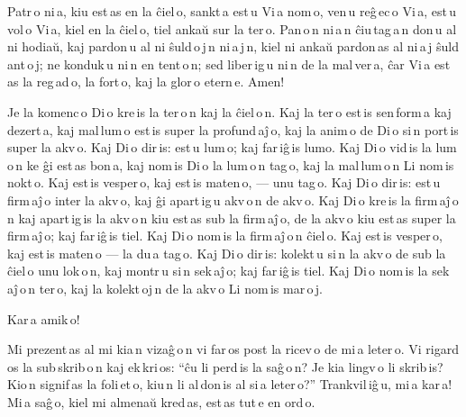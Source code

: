 
Patr\,o ni\,a, kiu est\,as en la ĉiel\,o, sankt\,a est\,u Vi\,a nom\,o, ven\,u reĝ\,ec\,o Vi\,a, est\,u vol\,o Vi\,a, kiel en la ĉiel\,o, tiel ankaŭ sur la ter\,o. Pan\,o\,n ni\,a\,n ĉiu\,tag\,a\,n don\,u al ni hodiaŭ, kaj pardon\,u al ni ŝuld\,o\,j\,n ni\,a\,j\,n, kiel ni ankaŭ pardon\,as al ni\,a\,j ŝuld\,ant\,o\,j; ne konduk\,u ni\,n en tent\,o\,n; sed liber\,ig\,u ni\,n de la mal\,ver\,a, ĉar Vi\,a est\,as la reg\,ad\,o, la fort\,o, kaj la glor\,o etern\,e. Amen!


Je la komenc\,o Di\,o kre\,is la ter\,o\,n kaj la ĉiel\,o\,n. Kaj la ter\,o est\,is sen\,form\,a kaj dezert\,a, kaj mal\,lum\,o est\,is super la profund\,aĵ\,o, kaj la anim\,o de Di\,o si\,n port\,is super la akv\,o. Kaj Di\,o dir\,is: est\,u lum\,o; kaj far\,iĝ\,is lumo. Kaj Di\,o vid\,is la lum\,o\,n ke ĝi est\,as bon\,a, kaj nom\,is Di\,o la lum\,o\,n tag\,o, kaj la mal\,lum\,o\,n Li nom\,is nokt\,o. Kaj est\,is vesper\,o, kaj est\,is maten\,o, --- unu tag\,o. Kaj Di\,o dir\,is: est\,u firm\,aĵ\,o inter la akv\,o, kaj ĝi apart\,ig\,u akv\,o\,n de akv\,o. Kaj Di\,o kre\,is la firm\,aĵ\,o\,n kaj apart\,ig\,is la akv\,o\,n kiu est\,as sub la firm\,aĵ\,o, de la akv\,o kiu est\,as super la firm\,aĵ\,o; kaj far\,iĝ\,is tiel. Kaj Di\,o nom\,is la firm\,aĵ\,o\,n ĉiel\,o. Kaj est\,is vesper\,o, kaj est\,is maten\,o --- la du\,a tag\,o. Kaj Di\,o dir\,is: kolekt\,u si\,n la akv\,o de sub la ĉiel\,o unu lok\,o\,n, kaj montr\,u si\,n sek\,aĵ\,o; kaj far\,iĝ\,is tiel. Kaj Di\,o nom\,is la sek\,aĵ\,o\,n ter\,o, kaj la kolekt\,oj\,n de la akv\,o Li nom\,is mar\,o\,j.


\hspace{5em} Kar\,a amik\,o!

Mi prezent\,as al mi kia\,n vizaĝ\,o\,n vi far\,os post la ricev\,o de mi\,a leter\,o. Vi rigard\,os la sub\,skrib\,o\,n kaj ek\,kri\,os: “ĉu li perd\,is la saĝ\,o\,n? Je kia lingv\,o li skrib\,is? Kio\,n signif\,as la foli\,et\,o, kiu\,n li al\,don\,is al si\,a leter\,o?” Trankvil\,iĝ\,u, mi\,a kar\,a! Mi\,a saĝ\,o, kiel mi almenaŭ kred\,as, est\,as tut\,e en ord\,o.

